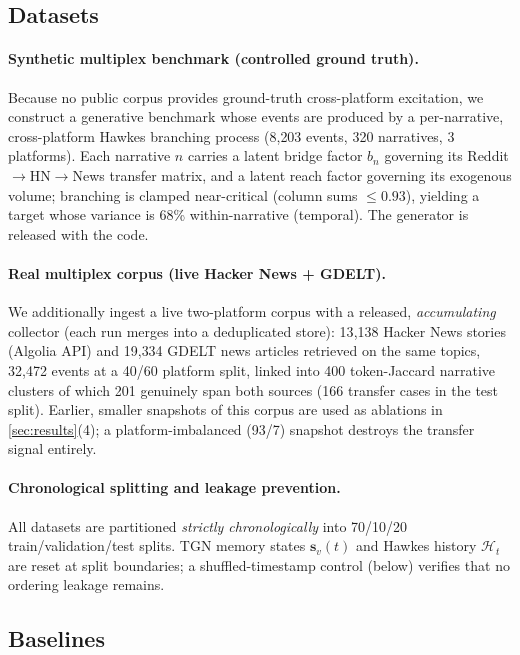 \documentclass[11pt]{article}
\newcommand{\bs}{\mathbf{s}}
\newcommand{\cH}{\mathcal{H}}
\begin{document}
\subsection{Datasets}
\label{sec:gdelt}

\paragraph{Synthetic multiplex benchmark (controlled ground truth).}
Because no public corpus provides ground-truth cross-platform excitation, we
construct a generative benchmark whose events are produced by a per-narrative,
cross-platform Hawkes branching process (8{,}203 events, 320 narratives, 3
platforms). Each narrative $n$ carries a latent bridge factor $b_n$ governing
its Reddit$\to$HN$\to$News transfer matrix, and a latent reach factor governing
its exogenous volume; branching is clamped near-critical (column sums
$\le 0.93$), yielding a target whose variance is 68\% within-narrative
(temporal). The generator is released with the code.

\paragraph{Real multiplex corpus (live Hacker News + GDELT).}
We additionally ingest a live two-platform corpus with a released,
\emph{accumulating} collector (each run merges into a deduplicated store):
13{,}138 Hacker News stories (Algolia API) and 19{,}334 GDELT news articles
retrieved on the same topics, 32{,}472 events at a 40/60 platform split,
linked into 400 token-Jaccard narrative clusters of which 201 genuinely span
both sources (166 transfer cases in the test split). Earlier, smaller
snapshots of this corpus are used as ablations in \cref{sec:results}(4);
a platform-imbalanced (93/7) snapshot destroys the transfer signal entirely.

\paragraph{Chronological splitting and leakage prevention.}
All datasets are partitioned \emph{strictly chronologically} into 70/10/20
train/validation/test splits. TGN memory states $\bs_v(t)$ and Hawkes history
$\cH_t$ are reset at split boundaries; a shuffled-timestamp control (below)
verifies that no ordering leakage remains.

\subsection{Baselines}
\end{document}

